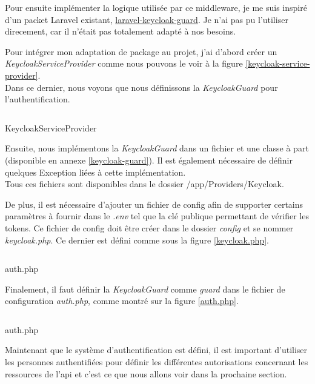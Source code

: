 \documentclass[
    iai, %
    il, %
]{heig-tb}
\begin{document}
Pour ensuite implémenter la logique utilisée par ce middleware, je me suis inspiré d'un packet Laravel existant, \href{https://github.com/robsontenorio/laravel-keycloak-guard}{laravel-keycloak-guard}. Je n'ai pas pu l'utiliser direcement, car il n'était pas totalement adapté à nos besoins.

Pour intégrer mon adaptation de package au projet, j'ai d'abord créer un \emph{KeycloakServiceProvider} comme nous pouvons le voir à la figure \ref{keycloak-service-provider}. \\
Dans ce dernier, nous voyons que nous définissons la \emph{KeycloakGuard} pour l'authentification.

\begin{listing}[h]
    \inputminted{php}{assets/code/KeycloakServiceProvider.php}
    \caption{KeycloakServiceProvider \label{keycloak-service-provider}}
\end{listing}

Ensuite, nous implémentons la \emph{KeycloakGuard} dans un fichier et une classe à part (disponible en annexe \ref{keycloak-guard}). Il est également nécessaire de définir quelques Exception liées à cette implémentation. \\
Tous ces fichiers sont disponibles dans le dossier /app/Providers/Keycloak.

De plus, il est nécessaire d'ajouter un fichier de config afin de supporter certains paramètres à fournir dans le \emph{.env} tel que la clé publique permettant de vérifier les tokens. Ce fichier de config doit être créer dans le dossier \emph{config} et se nommer \emph{keycloak.php}. Ce dernier est défini comme sous la figure \ref{keycloak.php}.

\begin{listing}[h]
    \inputminted{php}{assets/code/keycloak.php}
    \caption{auth.php \label{keycloak.php}}
\end{listing}

Finalement, il faut définir la \emph{KeycloakGuard} comme \emph{guard} dans le fichier de configuration \emph{auth.php}, comme montré sur la figure \ref{auth.php}.

\begin{listing}[h]
    \inputminted{php}{assets/code/auth.php}
    \caption{auth.php \label{auth.php}}
\end{listing}

Maintenant que le système d'authentification est défini, il est important d'utiliser les personnes authentifiées pour définir les différentes autorisations concernant les ressources de l'\Gls{api} et c'est ce que nous allons voir dans la prochaine section.
\end{document}
